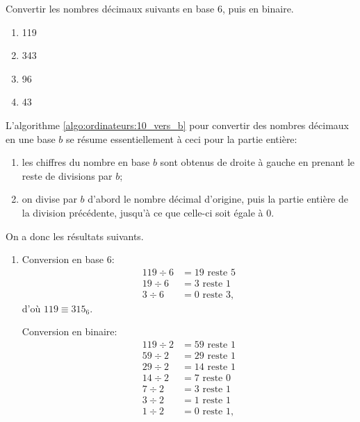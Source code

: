 \begin{exercice}
  Convertir les nombres décimaux suivants en base 6, puis en binaire.
  \begin{enumerate}
  \item 119
  \item 343
  \item 96
  \item 43
  \end{enumerate}
  \begin{sol}
    L'algorithme \ref{algo:ordinateurs:10_vers_b} pour convertir des
    nombres décimaux en une base $b$ se résume essentiellement à ceci
    pour la partie entière:
    \begin{enumerate}[1.]
    \item les chiffres du nombre en base $b$ sont obtenus de droite à
      gauche en prenant le reste de divisions par $b$;
    \item on divise par $b$ d'abord le nombre décimal d'origine, puis
      la partie entière de la division précédente, jusqu'à ce que
      celle-ci soit égale à 0.
    \end{enumerate}
    On a donc les résultats suivants.
    \begin{enumerate}
    \item
      \begin{minipage}[t]{0.48\linewidth}
        Conversion en base 6:
        \begin{align*}
          119 \div 6 &= 19 \text{ reste } 5 \\
           19 \div 6 &= 3 \text{ reste } 1 \\
            3 \div 6 &= 0 \text{ reste } 3,
        \end{align*}
        d'où $119 \equiv 315_6$.
      \end{minipage}
      \hfill
      \begin{minipage}[t]{0.48\linewidth}
        Conversion en binaire:
        \begin{align*}
          119 \div 2 &= 59 \text{ reste } 1 \\
           59 \div 2 &= 29 \text{ reste } 1 \\
           29 \div 2 &= 14 \text{ reste } 1 \\
           14 \div 2 &= 7 \text{ reste } 0 \\
            7 \div 2 &= 3 \text{ reste } 1 \\
            3 \div 2 &= 1 \text{ reste } 1 \\
            1 \div 2 &= 0 \text{ reste } 1,

\end{align*}
\end{minipage}
\end{enumerate}
\end{sol}
\end{exercice}
